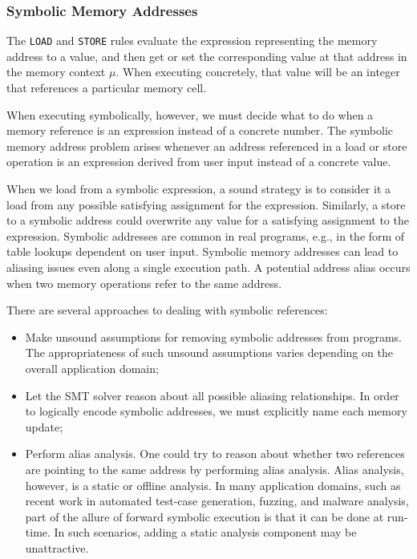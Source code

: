 \subsubsection{Symbolic Memory Addresses}
The \texttt{LOAD} and \texttt{STORE} rules evaluate the expression representing the memory address to a value, and then get or set the corresponding value at that address in the memory context $\mu$. When executing concretely, that value will be an integer that references a particular memory cell.

When executing symbolically, however, we must decide what to do when a memory reference is an expression instead of a concrete number. The symbolic memory address problem arises whenever an address referenced in a load or store operation is an expression derived from user input instead of a concrete value.

When we load from a symbolic expression, a sound strategy is to consider it a load from any possible satisfying assignment for the expression. Similarly, a store to a symbolic address could overwrite any value for a satisfying assignment to the expression. Symbolic addresses are common in real programs, e.g., in the form of table lookups dependent on user input. Symbolic memory addresses can lead to aliasing issues even along a single execution path. A potential address alias occurs when two memory operations refer to the same address.

There are several approaches to dealing with symbolic references:
\begin{itemize}
	\item Make unsound assumptions for removing symbolic addresses from programs. The appropriateness of such unsound assumptions
	varies depending on the overall application domain;
	\item Let the SMT solver reason about all possible aliasing relationships. In order to logically encode symbolic
	addresses, we must explicitly name each memory update;
	\item Perform alias analysis. One could try to reason about whether two references are pointing to the same address	by performing alias analysis. Alias analysis, however, is a static or offline analysis. In many application domains, such as recent work in automated test-case generation, fuzzing, and	malware analysis, part of the allure of forward	symbolic execution is that it can be done at run-time. In such scenarios, adding a static analysis component may be unattractive.
\end{itemize}


